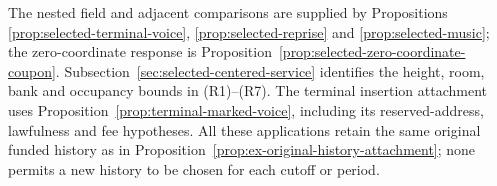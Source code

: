 The nested field and adjacent comparisons are supplied by
Propositions \ref{prop:selected-terminal-voice},
\ref{prop:selected-reprise} and \ref{prop:selected-music}; the
zero-coordinate response is Proposition~\ref{prop:selected-zero-coordinate-coupon}.
Subsection~\ref{sec:selected-centered-service} identifies the height,
room, bank and occupancy bounds in (R1)--(R7). The terminal insertion
attachment uses Proposition~\ref{prop:terminal-marked-voice}, including
its reserved-address, lawfulness and fee hypotheses. All these applications
retain the same original funded history as in
Proposition~\ref{prop:ex-original-history-attachment}; none permits a
new history to be chosen for each cutoff or period.
